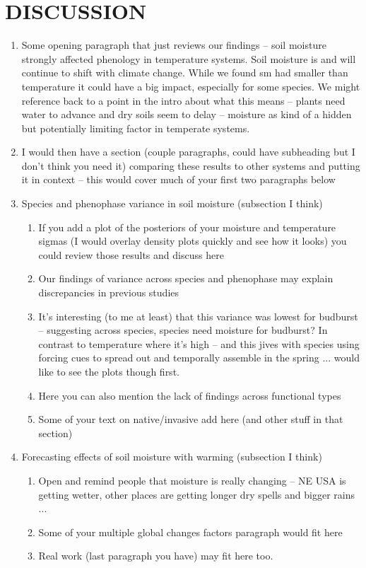 \documentclass{article}
\begin{document}
\section* {DISCUSSION}
\begin{enumerate}
\item Some opening paragraph that just reviews our findings -- soil moisture strongly affected phenology in temperature systems. Soil moisture is and will continue to shift with climate change. While we found sm had smaller than temperature it could have a big impact, especially for some species. We might reference back to a point in the intro about what this means -- plants need water to advance and dry soils seem to delay -- moisture as kind of a hidden but potentially limiting factor in temperate systems. 
\item I would then have a section (couple paragraphs, could have subheading but I don't think you need it) comparing these results to other systems and putting it in context -- this would cover much of your first two paragraphs below
\item Species and phenophase variance in soil moisture (subsection I think)
\begin{enumerate}
\item If you add a plot of the posteriors of your moisture and temperature sigmas (I would overlay density plots quickly and see how it looks) you could review those results and discuss here
\item Our findings of variance across species and phenophase may explain discrepancies in previous studies
\item It's interesting (to me at least) that this variance was lowest for budburst -- suggesting across species, species need moisture for budburst? In contrast to temperature where it's high -- and this jives with species using forcing cues to spread out and temporally assemble in the spring ... would like to see the plots though first.
\item Here you can also mention the lack of findings across functional types
\item Some of your text on native/invasive add here (and other stuff in that section)
\end{enumerate}
\item Forecasting effects of soil moisture with warming (subsection I think)
\begin{enumerate}
\item Open and remind people that moisture is really changing -- NE USA is getting wetter, other places are getting longer dry spells and bigger rains ...
\item Some of your multiple global changes factors paragraph would fit here
\item Real work (last paragraph you have) may fit here too. 
\end{enumerate}
\end{enumerate}
\end{document}
